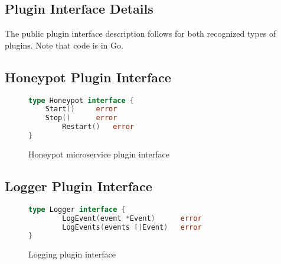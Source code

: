 \begin{appendices}

\chapter{Plugin Interface Details}

The public plugin interface description follows for both recognized types
of plugins. Note that code is in Go.

\section{Honeypot Plugin Interface}
\label{appendix:honeypot-iface}

\begin{figure}[h]
\begin{lstlisting}[language=go,frame=single,showstringspaces=false]
type Honeypot interface {
	Start()		error
   	Stop() 		error
    	Restart() 	error
}
\end{lstlisting}
\caption{Honeypot microservice plugin interface}
\label{figure:honeypot-plugin-iface}
\end{figure}

\section{Logger Plugin Interface}
\label{appendix:logger-iface}

\begin{figure}[h]
\begin{lstlisting}[language=go,frame=single,showstringspaces=false]
type Logger interface {
    	LogEvent(event *Event) 		error
    	LogEvents(events []Event)	error
}
\end{lstlisting}
\caption{Logging plugin interface}
\label{figure:honeypot-plugin-iface}
\end{figure}

\end{appendices}
